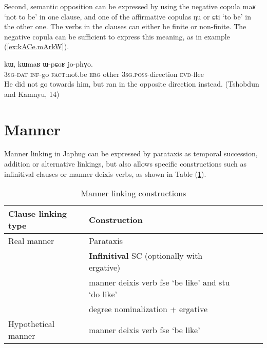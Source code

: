 \documentclass[oldfontcommands,oneside,a4paper,11pt]{article}
\newcommand{\ipa}[1]{{\phon \mbox{#1}}} %
\newcommand{\refb}[1]{(\ref{#1})}
\begin{document}
Second, semantic opposition can be expressed by using the negative copula \ipa{maʁ} `not to be' in one clause, and one of the affirmative copulas \ipa{ŋu} or \ipa{ɕti} `to be' in the other one. The verbs in the clauses can either be finite or non-finite. The negative copula can be sufficient to express this meaning, as in example \refb{ex:kACe.mArkW}.

\begin{exe}
\ex \label{ex:kACe.mArkW}
\gll
[\ipa{ɯ-ɕki}  	\ipa{kɤ-ɕe}]  	\ipa{maʁ}  	\ipa{kɯ,}  	\ipa{kɯmaʁ}  	\ipa{ɯ-pɕoʁ}  	\ipa{jo-phɣo.}  \\
\textsc{3sg-dat} \textsc{inf}-go \textsc{fact}:not.be \textsc{erg} other \textsc{3sg.poss}-direction \textsc{evd}-flee \\
 \glt He did not go towards him, but ran in the opposite direction instead. (Tshobdun and Kamnyu, 14)
\end{exe}
 

%
% 
	 
	 

\section{Manner} \label{sec:manner}

Manner linking in Japhug can be expressed by parataxis as temporal succession, addition or alternative linkings, but also allows specific constructions such as infinitival clauses or manner deixis verbs, as shown in Table \refb{tab:manner}.

\begin{table}[h]
\caption{Manner linking constructions} \label{tab:manner}
\begin{tabular}{lllll}
\toprule
 Clause linking type &Construction \\
\midrule
Real manner & Parataxis \\
& \textbf{Infinitival} SC (optionally with ergative)\\
& manner deixis   verb \ipa{fse} `be like' and \ipa{stu} `do like' \\
& degree nominalization + ergative \\
\midrule
Hypothetical manner & manner deixis   verb \ipa{fse} `be like'   \\
\bottomrule
\end{tabular}
\end{table}
 
\end{document}

